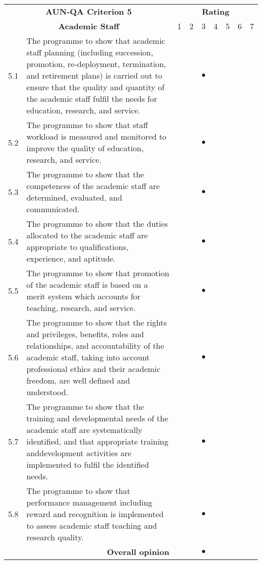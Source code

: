 \begin{longtable}{|c| p{}|p{0.3cm}|p{0.3cm}|c|p{0.3cm}|p{0.3cm}|p{0.3cm}|p{0.3cm}|}
	\hline
	\multicolumn{2}{|c|}{\bf AUN-QA Criterion 5}&\multicolumn{7}{c|}{\bf Rating}\\\cline{3-9}
	\multicolumn{2}{|c|}{\bf Academic Staff}&1&2&3&4&5&6&7\\\hline
	\endhead

5.1& The programme to show that academic staff planning (including succession, promotion, re-deployment, termination, and retirement plans) is carried out to
ensure that the quality and quantity of the academic staff fulfil the needs for education, research, and service.&&& {\huge{$\bullet$}}&&&&\\\hline 

5.2&The programme to show that staff workload is measured and monitored to improve the quality of education, research, and service.&&& {\huge{$\bullet$}}&&&&\\\hline

5.3&The programme to show that the competences of the academic staff are determined, evaluated, and communicated.&&& {\huge{$\bullet$}}&&&&\\\hline

5.4&The programme to show that the duties allocated to the academic staff are appropriate to qualifications, experience, and aptitude.&&& {\huge{$\bullet$}}&&&&\\\hline

5.5&The programme to show that promotion of the academic staff is based on a merit system which accounts for teaching, research, and service.&&& {\huge{$\bullet$}}&&&&\\\hline

5.6&The programme to show that the rights and privileges, benefits, roles and relationships, and accountability of the academic staff, taking into account professional ethics and their academic freedom, are well defined and understood.&&& {\huge{$\bullet$}}&&&&\\\hline

5.7&The programme to show that the training and developmental needs of the academic staff are systematically identified, and that appropriate training anddevelopment activities are implemented to fulfil the identified needs.&&& {\huge{$\bullet$}}&&&&\\\hline

5.8&The programme to show that performance management including reward and recognition is implemented to assess academic staff teaching and research quality.&&& {\huge{$\bullet$}}&&&&\\\hline

\multicolumn{2}{|r|}{\bf Overall opinion}&&& {\huge{$\bullet$}}&&&&\\\hline
\end{longtable}


